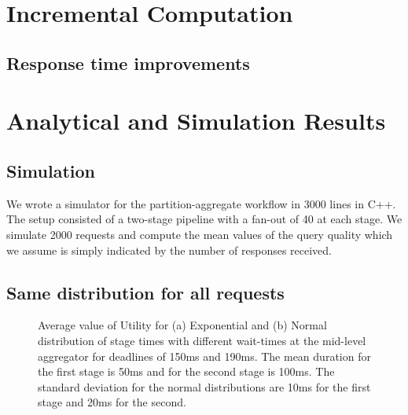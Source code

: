 \documentclass[letterpaper,twocolumn,10pt]{article}
\begin{document}



\section{Incremental Computation}


\subsection{Response time improvements}


\section{Analytical and Simulation Results}
\subsection{Simulation}
We wrote a simulator for the partition-aggregate workflow in 3000 lines in C++. The setup consisted of a two-stage pipeline with a fan-out of 40 at each stage. We simulate 2000 requests and compute the mean values of the query quality which we assume is simply indicated by the number of responses received. 

\subsection{Same distribution for all requests}
\begin{figure}[!t]
\centering
{}
\vspace{0.1in}
\caption{Average value of Utility for (a) Exponential and (b) Normal distribution of stage times with different wait-times at the mid-level aggregator for deadlines of 150ms and 190ms. The mean duration for the first stage is 50ms and for the second stage is 100ms. The standard deviation for the normal distributions are 10ms for the first stage and 20ms for the second.}
\end{figure}
\end{document}

